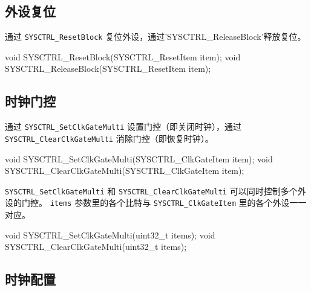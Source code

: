 \documentclass[
  12pt,
]{book}
\newenvironment{Shaded}{\begin{snugshade}}{\end{snugshade}}
\newcommand{\DataTypeTok}[1]{\textcolor[rgb]{0.13,0.29,0.53}{#1}}
\newcommand{\NormalTok}[1]{#1}
\begin{document}
\hypertarget{ux5916ux8bbeux590dux4f4d}{%
\subsection{外设复位}\label{ux5916ux8bbeux590dux4f4d}}

通过 \texttt{SYSCTRL\_ResetBlock} 复位外设，通过'SYSCTRL\_ReleaseBlock'释放复位。

\begin{Shaded}
\begin{Highlighting}[]
\DataTypeTok{void}\NormalTok{ SYSCTRL_ResetBlock(SYSCTRL_ResetItem item);}
\DataTypeTok{void}\NormalTok{ SYSCTRL_ReleaseBlock(SYSCTRL_ResetItem item);}
\end{Highlighting}
\end{Shaded}

\hypertarget{ux65f6ux949fux95e8ux63a7}{%
\subsection{时钟门控}\label{ux65f6ux949fux95e8ux63a7}}

通过 \texttt{SYSCTRL\_SetClkGateMulti} 设置门控（即关闭时钟），通过 \texttt{SYSCTRL\_ClearClkGateMulti} 消除门控（即恢复时钟）。

\begin{Shaded}
\begin{Highlighting}[]
\DataTypeTok{void}\NormalTok{ SYSCTRL_SetClkGateMulti(SYSCTRL_ClkGateItem item);}
\DataTypeTok{void}\NormalTok{ SYSCTRL_ClearClkGateMulti(SYSCTRL_ClkGateItem item);}
\end{Highlighting}
\end{Shaded}

\texttt{SYSCTRL\_SetClkGateMulti} 和 \texttt{SYSCTRL\_ClearClkGateMulti} 可以同时控制多个外设的门控。 \texttt{items} 参数里的各个比特与 \texttt{SYSCTRL\_ClkGateItem} 里的各个外设一一对应。

\begin{Shaded}
\begin{Highlighting}[]
\DataTypeTok{void}\NormalTok{ SYSCTRL_SetClkGateMulti(}\DataTypeTok{uint32_t}\NormalTok{ items);}
\DataTypeTok{void}\NormalTok{ SYSCTRL_ClearClkGateMulti(}\DataTypeTok{uint32_t}\NormalTok{ items);}
\end{Highlighting}
\end{Shaded}

\hypertarget{ux65f6ux949fux914dux7f6e}{%
\subsection{时钟配置}\label{ux65f6ux949fux914dux7f6e}}
\end{document}
